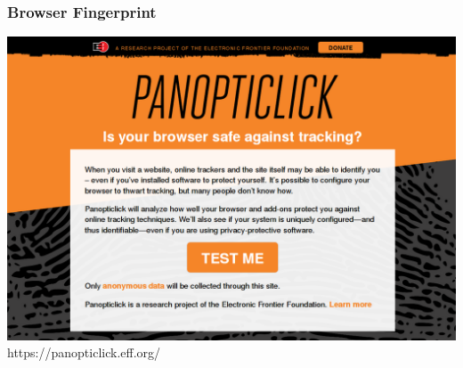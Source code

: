  \begin{frame}
    \frametitle{Browser Fingerprint}
    \includegraphics[height=0.7\textheight]{img/browser_fingerprint.png}
    \newline
    https://panopticlick.eff.org/
  \end{frame}
